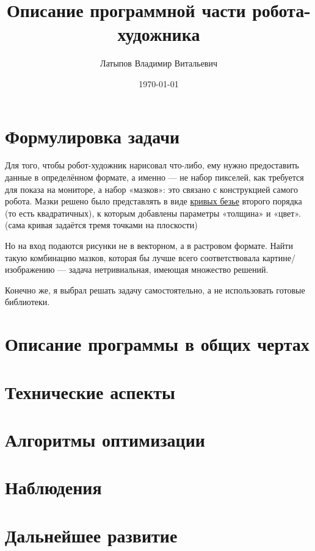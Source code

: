 \documentclass[11pt]{article}
\title{Описание программной части робота-художника}
\author{Латыпов Владимир Витальевич}
\date{\today}
\begin{document}
    \maketitle
    \newpage
    \tableofcontents
    \newpage

    \section{Формулировка задачи}

    Для того, чтобы робот-художник нарисовал что-либо, ему нужно предоставить данные в определённом формате, а именно — не набор пикселей,
    как требуется для показа на мониторе, а набор «мазков»: это связано с конструкцией самого робота.
    Мазки решено было представлять в виде \href{https://en.wikipedia.org/wiki/B\%C3\%A9zier_curve}{кривых безье} второго порядка (то есть квадратичных), к которым добавлены параметры «толщина» и «цвет».
    (сама кривая задаётся тремя точками на плоскости)

    Но на вход подаются рисунки не в векторном, а в растровом формате.
    Найти такую комбинацию мазков, которая бы лучше всего соответствовала картине/изображению — задача нетривиальная, имеющая множество решений.

    Конечно же, я выбрал решать задачу самостоятельно, а не использовать готовые библиотеки.

    \section{Описание программы в общих чертах}\label{sec:general_description}
    

    \section{Технические аспекты}\label{sec:tecnical}
    

    \section {Алгоритмы оптимизации}\label{sec:opimization_algorithms}
    

    \section{Наблюдения}\label{sec:observations}
    

    \section{Дальнейшее развитие}\label{sec:todo}
    
\end{document}

